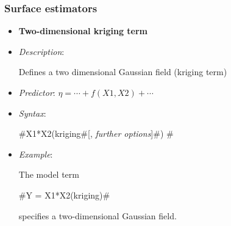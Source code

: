 \subsubsection*{Surface estimators}

\begin{itemize}
\item[] {\bf\sffamily Two-dimensional kriging term}

\item[] {\em Description}:

Defines a two dimensional Gaussian field (kriging term)

\item[] {\em Predictor}: $\eta= \cdots + f(X1,X2) + \cdots$
\item[] {\em Syntax}:

#X1*X2(kriging#[, {\em further options}]#) #
\item[] {\em Example}:

The model term

#Y = X1*X2(kriging)#

specifies a two-dimensional Gaussian field.



%
%
%
%
%
%
%
%
%
\end{itemize}




